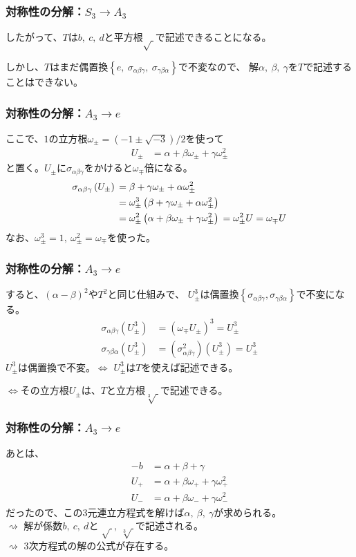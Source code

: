 \documentclass[12pt, t]{beamer}
\newcommand{\lr}[1]{\left({}#1\right){}}
\newcommand{\clr}[1]{\left\{{}#1\right\}{}}
\begin{document}
\begin{frame}
\frametitle{対称性の分解：$S_3 \rightarrow A_3$}
したがって、$T$は$b,\ c,\ d$と平方根$\sqrt{\ }$で記述できることになる。

しかし、$T$はまだ偶置換$\clr{e,\ \sigma_{\alpha \beta \gamma},\ \sigma_{\gamma \beta \alpha}}$で不変なので、
解$\alpha,\ \beta,\ \gamma$を$T$で記述することはできない。
\end{frame}

\begin{frame}
\frametitle{対称性の分解：$A_3 \rightarrow e$}
ここで、$1$の立方根$\omega_{\pm} = (-1 \pm \sqrt{-3})/2$を使って
\begin{align}
  U_{\pm} &= \alpha + \beta \omega_{\pm} + \gamma \omega_{\pm}^2
\end{align}
と置く。$U_{\pm}$に$\sigma_{\alpha \beta \gamma}$をかけると$\omega_{\mp}$倍になる。
\begin{align}
  \sigma_{\alpha \beta \gamma}\lr{U_{\pm}} &= \beta + \gamma \omega_{\pm} + \alpha \omega_{\pm}^2 \notag \\
                                     &= \omega_{\pm}^3 \lr{\beta + \gamma \omega_{\pm} + \alpha \omega_{\pm}^2} \notag \\
                                     &= \omega_{\pm}^2 \lr{\alpha + \beta \omega_{\pm} + \gamma \omega_{\pm}^2} = \omega_{\pm}^2 U = \omega_{\mp} U
\end{align}
なお、$\omega_\pm^3 = 1,\ \omega_\pm^2 = \omega_{\mp}$を使った。
\end{frame}

\begin{frame}
\frametitle{対称性の分解：$A_3 \rightarrow e$}
すると、$(\alpha - \beta)^2$や$T^2$と同じ仕組みで、
$U_{\pm}^3$は偶置換$\clr{\sigma_{\alpha \beta \gamma}, \sigma_{\gamma \beta \alpha}}$で不変になる。
\begin{align}
  \sigma_{\alpha \beta \gamma} \lr{U_{\pm}^3} &= (\omega_{\mp} U_{\pm})^3 = U_{\pm}^3 \\
  \sigma_{\gamma \beta \alpha} \lr{U_{\pm}^3} &= \lr{\sigma_{\alpha \beta \gamma}^2}\lr{U_{\pm}^3} = U_{\pm}^3
\end{align}
$U_{\pm}^3$は偶置換で不変。$\Leftrightarrow$ $U_{\pm}^3$は$T$を使えば記述できる。

$\Leftrightarrow$その立方根$U_{\pm}$は、$T$と立方根$\sqrt[3]{\ }$で記述できる。
\end{frame}

\begin{frame}
\frametitle{対称性の分解：$A_3 \rightarrow e$}
あとは、
\begin{align}
  -b   &= \alpha + \beta + \gamma \\
  U_+  &= \alpha + \beta \omega_+ + \gamma \omega_+^2 \\
  U_-  &= \alpha + \beta \omega_- + \gamma \omega_-^2
\end{align}
だったので、この$3$元連立方程式を解けば$\alpha,\ \beta,\ \gamma$が求められる。\\
$\rightsquigarrow$ 解が係数$b,\ c,\ d$と
$\sqrt{\ },\ \sqrt[3]{\ }$で記述される。\\
$\rightsquigarrow$ $3$次方程式の解の公式が存在する。
\end{frame}
\end{document}
